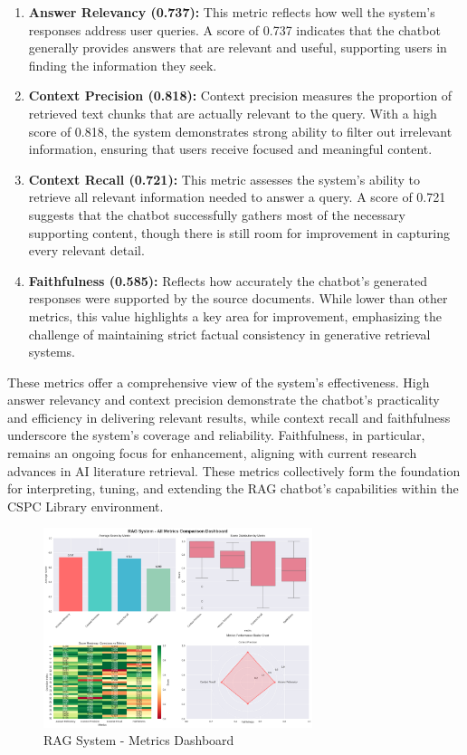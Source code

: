 \begin{refsection}
\begin{enumerate}
\item \textbf{Answer Relevancy (0.737):} This metric reflects how well the system’s responses address user queries. A score of 0.737 indicates that the chatbot generally provides answers that are relevant and useful, supporting users in finding the information they seek.
\item \textbf{Context Precision (0.818):} Context precision measures the proportion of retrieved text chunks that are actually relevant to the query. With a high score of 0.818, the system demonstrates strong ability to filter out irrelevant information, ensuring that users receive focused and meaningful content.
\item \textbf{Context Recall (0.721):} This metric assesses the system’s ability to retrieve all relevant information needed to answer a query. A score of 0.721 suggests that the chatbot successfully gathers most of the necessary supporting content, though there is still room for improvement in capturing every relevant detail.
\item \textbf{Faithfulness (0.585):} Reflects how accurately the chatbot's generated responses were supported by the source documents. While lower than other metrics, this value highlights a key area for improvement, emphasizing the challenge of maintaining strict factual consistency in generative retrieval systems.
\end{enumerate}

\noindent These metrics offer a comprehensive view of the system’s effectiveness. High answer relevancy and context precision demonstrate the chatbot’s practicality and efficiency in delivering relevant results, while context recall and faithfulness underscore the system’s coverage and reliability. Faithfulness, in particular, remains an ongoing focus for enhancement, aligning with current research advances in AI literature retrieval. These metrics collectively form the foundation for interpreting, tuning, and extending the RAG chatbot’s capabilities within the CSPC Library environment.

\begin{figure}[h]
    \centering
    \includegraphics[width=0.7\textwidth]{figures/overall_out.png}
    \caption{RAG System - Metrics Dashboard}
\end{figure}


\end{refsection}
